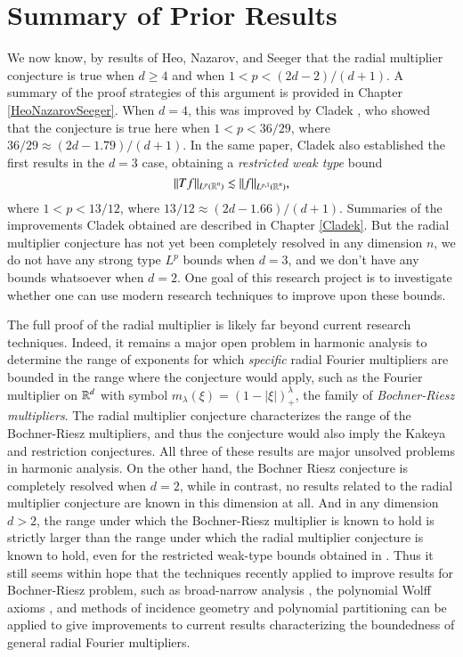 \section{Summary of Prior Results}

We now know, by results of Heo, Nazarov, and Seeger \cite{HeoandNazarovandSeeger} that the radial multiplier conjecture is true when $d \geq 4$ and when $1 < p < (2d-2)/(d+1)$. A summary of the proof strategies of this argument is provided in Chapter \ref{HeoNazarovSeeger}. When $d = 4$, this was improved by Cladek \cite{Cladek}, who showed that the conjecture is true here when $1 < p < 36/29$, where $36/29 \approx (2d - 1.79)/(d+1)$. In the same paper, Cladek also established the first results in the $d = 3$ case, obtaining a \emph{restricted weak type} bound
% 
\[ \| Tf \|_{L^p(\operatorname{\mathbb{R}}^n)} \lesssim \| f \|_{L^{p,1}(\operatorname{\mathbb{R}}^n)}, \]
where $1 < p < 13/12$, where $13/12 \approx (2d - 1.66)/(d+1)$. Summaries of the improvements Cladek obtained are described in Chapter \ref{Cladek}. But the radial multiplier conjecture has not yet been completely resolved in any dimension $n$, we do not have any strong type $L^p$ bounds when $d = 3$, and we don't have any bounds whatsoever when $d = 2$. One goal of this research project is to investigate whether one can use modern research techniques to improve upon these bounds.

The full proof of the radial multiplier is likely far beyond current research techniques. Indeed, it remains a major open problem in harmonic analysis to determine the range of exponents for which \emph{specific} radial Fourier multipliers are bounded in the range where the conjecture would apply, such as the Fourier multiplier on $\operatorname{\mathbb{R}}^d$ with symbol $m_\lambda(\xi) = \left( 1 - |\xi| \right)^\lambda_+$, the family of \emph{Bochner-Riesz multipliers}. The radial multiplier conjecture characterizes the range of the Bochner-Riesz multipliers, and thus the conjecture would also imply the Kakeya and restriction conjectures. All three of these results are major unsolved problems in harmonic analysis. On the other hand, the Bochner Riesz conjecture is completely resolved when $d = 2$, while in contrast, no results related to the radial multiplier conjecture are known in this dimension at all. And in any dimension $d > 2$, the range under which the Bochner-Riesz multiplier is known to hold \cite{GuoandOhandWangandWuandZhang} is strictly larger than the range under which the radial multiplier conjecture is known to hold, even for the restricted weak-type bounds obtained in \cite{Cladek}. Thus it still seems within hope that the techniques recently applied to improve results for Bochner-Riesz problem, such as broad-narrow analysis \cite{BourgainandGuth}, the polynomial Wolff axioms \cite{KatzandRogers}, and methods of incidence geometry and polynomial partitioning \cite{Zahl2} can be applied to give improvements to current results characterizing the boundedness of general radial Fourier multipliers.

